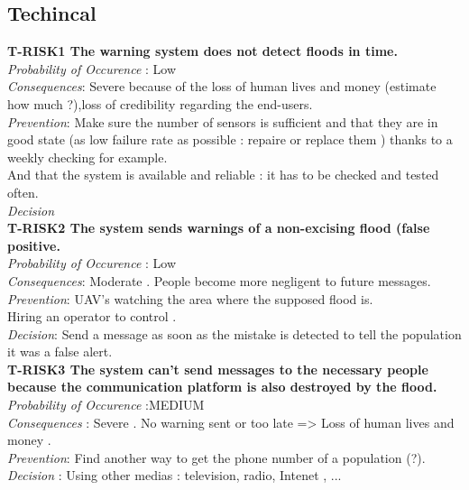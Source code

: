 \subsection{Techincal}

	\textbf{ T-RISK1 The warning system does not detect floods in time.} \\
	\textit{Probability of Occurence} : Low \\ %
	\textit{Consequences}: Severe because of the loss of human lives and money (estimate how much ?),loss of credibility regarding the end-users.\\
	\textit{Prevention}: Make sure the number of sensors is sufficient and that they are in good state (as low failure rate as possible : repaire or replace them ) thanks to a weekly checking for example. \\
	And that the system is available and reliable : it has to be checked and tested often.\\
	\textit{Decision} \\
	

	\textbf{ T-RISK2 The system sends warnings of a non-excising flood (false positive.} \\
	\textit{Probability of Occurence} : Low \\
	\textit{Consequences}: Moderate . People become more negligent to future messages. \\
	\textit{Prevention}: UAV's watching the area where the supposed flood is.\\
	Hiring an operator to control . \\
	\textit{Decision}: Send a message as soon as the mistake is detected to tell the population it was a false alert. \\

	

	\textbf{ T-RISK3 The system can't send messages to the necessary people because the communication platform is also destroyed by the flood.} \\
	\textit{Probability of Occurence} :MEDIUM\\
	\textit{Consequences} : Severe . No warning sent or too late => Loss of human lives and money .\\
	\textit{Prevention}: Find another way to get the phone number of a population (?). \\
	\textit{Decision} : Using other medias : television, radio, Intenet , ... \\
	

